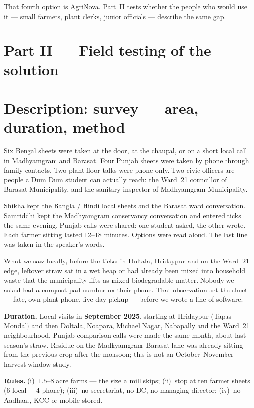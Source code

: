 \documentclass[12pt,a4paper]{article}
\begin{document}
That fourth option is AgriNova. Part~II tests whether the people who would use it --- small farmers, plant clerks, junior officials --- describe the same gap.

\newpage
\section*{Part II --- Field testing of the solution}

\section{Description: survey --- area, duration, method}
Six Bengal sheets were taken at the door, at the chaupal, or on a short local call in Madhyamgram and Barasat. Four Punjab sheets were taken by phone through family contacts. Two plant-floor talks were phone-only. Two civic officers are people a Dum Dum student can actually reach: the Ward~21 councillor of Barasat Municipality, and the sanitary inspector of Madhyamgram Municipality.

Shikha kept the Bangla / Hindi local sheets and the Barasat ward conversation. Samriddhi kept the Madhyamgram conservancy conversation and entered ticks the same evening. Punjab calls were shared: one student asked, the other wrote. Each farmer sitting lasted 12--18 minutes. Options were read aloud. The last line was taken in the speaker's words.

What we saw locally, before the ticks: in Doltala, Hridaypur and on the Ward~21 edge, leftover straw sat in a wet heap or had already been mixed into household waste that the municipality lifts as mixed biodegradable matter. Nobody we asked had a compost-pad number on their phone. That observation set the sheet --- fate, own plant phone, five-day pickup --- before we wrote a line of software.

\textbf{Duration.} Local visits in \textbf{September 2025}, starting at Hridaypur (Tapas Mondal) and then Doltala, Noapara, Michael Nagar, Nabapally and the Ward~21 neighbourhood. Punjab comparison calls were made the same month, about last season's straw. Residue on the Madhyamgram--Barasat lane was already sitting from the previous crop after the monsoon; this is not an October--November harvest-window study.

\textbf{Rules.} (i)~1.5--8 acre farms --- the size a mill skips; (ii)~stop at ten farmer sheets (6 local + 4 phone); (iii)~no secretariat, no DC, no managing director; (iv)~no Aadhaar, KCC or mobile stored.
\end{document}
